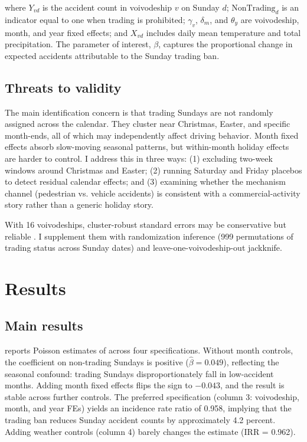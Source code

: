 \documentclass[12pt]{article}
\begin{document}
\noindent where $Y_{vd}$ is the accident count in voivodeship $v$ on Sunday $d$; $\text{NonTrading}_d$ is an indicator equal to one when trading is prohibited; $\gamma_v$, $\delta_m$, and $\theta_y$ are voivodeship, month, and year fixed effects; and $X_{vd}$ includes daily mean temperature and total precipitation. The parameter of interest, $\beta$, captures the proportional change in expected accidents attributable to the Sunday trading ban.

\subsection{Threats to validity}

The main identification concern is that trading Sundays are not randomly assigned across the calendar. They cluster near Christmas, Easter, and specific month-ends, all of which may independently affect driving behavior. Month fixed effects absorb slow-moving seasonal patterns, but within-month holiday effects are harder to control. I address this in three ways: (1) excluding two-week windows around Christmas and Easter; (2) running Saturday and Friday placebos to detect residual calendar effects; and (3) examining whether the mechanism channel (pedestrian vs. vehicle accidents) is consistent with a commercial-activity story rather than a generic holiday story.

With 16 voivodeships, cluster-robust standard errors may be conservative but reliable \citep{cameron2015practitioners}. I supplement them with randomization inference (999 permutations of trading status across Sunday dates) and leave-one-voivodeship-out jackknife.


\section{Results}
\label{sec:results}

\subsection{Main results}

 reports Poisson estimates of  across four specifications. Without month controls, the coefficient on non-trading Sundays is positive ($\hat{\beta} = 0.049$), reflecting the seasonal confound: trading Sundays disproportionately fall in low-accident months. Adding month fixed effects flips the sign to $-0.043$, and the result is stable across further controls. The preferred specification (column 3: voivodeship, month, and year FEs) yields an incidence rate ratio of 0.958, implying that the trading ban reduces Sunday accident counts by approximately 4.2 percent. Adding weather controls (column 4) barely changes the estimate (IRR = 0.962).
\end{document}
